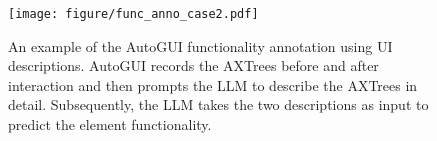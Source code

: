 \begin{figure}[th]
    \centering
    \texttt{[image: figure/func\_anno\_case2.pdf]}
    \caption{An example of the AutoGUI functionality annotation using UI descriptions. AutoGUI records the AXTrees before and after interaction and then prompts the LLM to describe the AXTrees in detail. Subsequently, the LLM takes the two descriptions as input to predict the element functionality.}
    \label{fig: funcpred desc case}
\end{figure}
